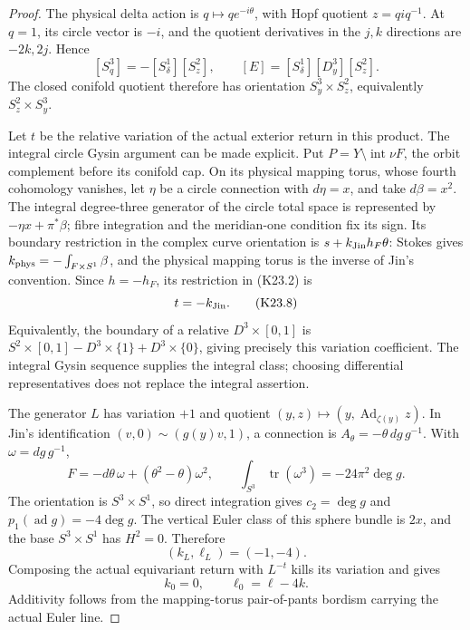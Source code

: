 \begin{proof}
The physical delta action is \(q\mapsto q e^{-i\theta}\), with
Hopf quotient \(z=q i q^{-1}\). At \(q=1\), its circle vector is
\(-i\), and the quotient derivatives in the \(j,k\) directions are
\(-2k,2j\). Hence
\[
 [S^3_q]=-[S^1_\delta][S^2_z],\qquad
 [E]=[S^1_\delta][D^3_y][S^2_z].                    \tag{K23.7}
\]
The closed conifold quotient therefore has orientation
\(S^3_y\times S^2_z\), equivalently \(S^2_z\times S^3_y\).

Let \(t\) be the relative variation of the actual exterior return in
this product. The integral circle Gysin argument can be made
explicit. Put \(P=Y\setminus\operatorname{int}\nu F\), the orbit
complement before its conifold cap. On its physical mapping torus,
whose fourth cohomology vanishes, let \(\eta\)
be a circle connection with \(d\eta=x\), and take
\(d\beta=x^2\). The integral degree-three generator of the circle
total space is represented by
\(-\eta x+\pi^*\beta\); fibre integration and the meridian-one
condition fix its sign. Its boundary restriction in the complex
curve orientation is \(s+k_{\rm Jin}h_F\theta\):
Stokes gives \(k_{\rm phys}=-\int_{F\times S^1}\beta\), and the
physical mapping torus is the inverse of Jin's convention.
Since \(h=-h_F\), its restriction in (K23.2) is
\[
                         t=-k_{\rm Jin}.             \tag{K23.8}
\]
Equivalently, the boundary of a relative \(D^3\times[0,1]\) is
\(S^2\times[0,1]-D^3\times\{1\}+D^3\times\{0\}\), giving precisely
this variation coefficient. The integral Gysin sequence supplies
the integral class; choosing differential representatives does not
replace the integral assertion.

The generator \(L\) has variation \(+1\) and quotient
\((y,z)\mapsto(y,\operatorname{Ad}_{\zeta(y)}z)\). In Jin's
identification \((v,0)\sim(g(y)v,1)\), a connection is
\(A_\theta=-\theta\,dg\,g^{-1}\). With \(\omega=dg\,g^{-1}\),
\[
 F=-d\theta\,\omega+(\theta^2-\theta)\omega^2,\qquad
 \int_{S^3}\operatorname{tr}(\omega^3)
                      =-24\pi^2\deg g.
\]
The orientation is \(S^3\times S^1\), so direct integration gives
\(c_2=\deg g\) and \(p_1(\operatorname{ad}g)=-4\deg g\).
The vertical Euler class of this sphere bundle is \(2x\), and
the base \(S^3\times S^1\) has \(H^2=0\). Therefore
\[
                       (k_L,\ell_L)=(-1,-4).
\]
Composing the actual equivariant return with \(L^{-t}\) kills its
variation and gives
\[
                      k_0=0,\qquad \ell_0=\ell-4k.    \tag{K23.9}
\]
Additivity follows from the mapping-torus pair-of-pants bordism
carrying the actual Euler line.


\end{proof}

